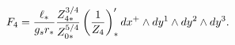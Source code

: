 \begin{equation}
F_{4}={\ell_{*}\over g_{s}r_{*}}{Z^{3/4}_{4*}\over Z^{5/4}_{0*}}
\left( {1\over Z_{4}}\right)'_{*}dx^{+}\wedge dy^{1}
\wedge dy^{2}\wedge dy^{3}.
\end{equation}


